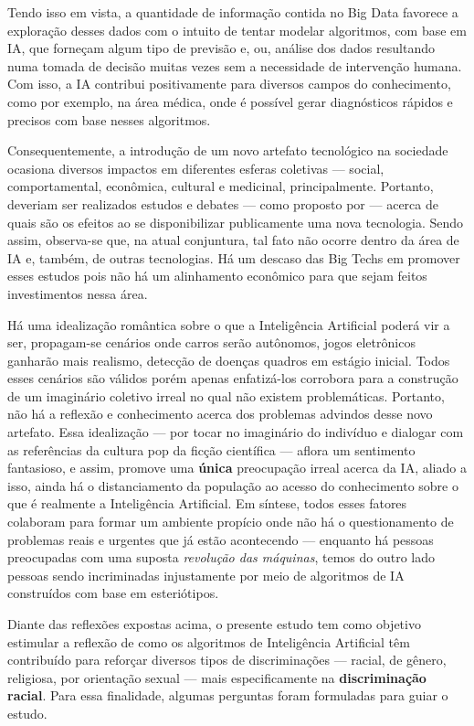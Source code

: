 Tendo isso em vista, a quantidade de informação contida no Big Data favorece a exploração desses dados com o intuito de tentar modelar algoritmos, com base em IA, que forneçam algum tipo de previsão e, ou, análise dos dados resultando numa tomada de decisão muitas vezes sem a necessidade de intervenção humana. Com isso, a IA contribui positivamente para diversos campos do conhecimento, como por exemplo, na área médica, onde é possível gerar diagnósticos rápidos e precisos com base nesses algoritmos.


Consequentemente, a introdução de um novo artefato tecnológico na sociedade ocasiona diversos impactos em diferentes esferas coletivas --- social, comportamental, econômica, cultural e medicinal, principalmente. Portanto, deveriam ser realizados estudos e debates --- como proposto por \citet{simon_jones_doing_2016}  --- acerca de quais são os efeitos ao se disponibilizar publicamente uma nova tecnologia. Sendo assim, observa-se que, na atual conjuntura, tal fato não ocorre dentro da área de IA e, também, de outras tecnologias. Há um descaso das Big Techs em promover esses estudos pois não há um alinhamento econômico para que sejam feitos investimentos nessa área.  

Há uma idealização romântica sobre o que a Inteligência Artificial poderá vir a ser, propagam-se cenários onde carros serão autônomos, jogos eletrônicos ganharão mais realismo, detecção de doenças quadros em estágio inicial. Todos esses cenários são válidos porém apenas enfatizá-los corrobora para a construção de um imaginário coletivo irreal no qual não existem problemáticas. Portanto, não há a reflexão e conhecimento acerca dos problemas advindos desse novo artefato. Essa idealização --- por tocar no imaginário do indivíduo e dialogar com as referências da cultura pop da ficção científica --- aflora um sentimento fantasioso, e assim, promove uma \textbf{única} preocupação irreal acerca da IA, aliado a isso, ainda há o distanciamento da população ao acesso do conhecimento sobre o que é realmente a Inteligência Artificial. Em síntese, todos esses fatores colaboram para formar um ambiente propício onde não há o questionamento de problemas reais e urgentes que já estão acontecendo --- enquanto há pessoas preocupadas com uma suposta \textit{revolução das máquinas}, temos do outro lado pessoas sendo incriminadas injustamente por meio de algoritmos de IA construídos com base em esteriótipos.


Diante das reflexões expostas acima, o presente estudo tem como objetivo estimular a reflexão de como os algoritmos de Inteligência Artificial têm contribuído para reforçar diversos tipos de discriminações --- racial, de gênero, religiosa, por orientação sexual --- mais especificamente na \textbf{discriminação racial}. Para essa finalidade, algumas perguntas foram formuladas para guiar o estudo.


